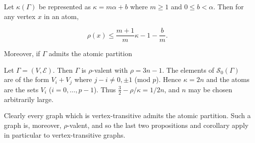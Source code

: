 Let $\kappa(\Gamma)$ be represented as $\kappa = m\alpha + b$ where $m \geq 1$ and $0 \leq b < \alpha$. Then for any vertex $x$ in an atom,

$$\rho(x) \leq \frac{m + 1}{m} \kappa - 1 - \frac{b}{m}.$$

Moreover, if $\Gamma$ admits the atomic partition

Let $\Gamma = (V, \mathcal{E})$. Then $\Gamma$ is $\rho$-valent with $\rho = 3n - 1$. The elements of $\mathcal{S}_0(\Gamma)$ are of the form $V_i + V_j$ where $j - i \neq 0, \pm 1$ (mod $p$). Hence $\kappa = 2n$ and the atoms are the sets $V_i$ ($i = 0, \ldots, p - 1$). Thus $\frac{3}{2} - \rho/\kappa = 1/2n$, and $n$ may be chosen arbitrarily large.

Clearly every graph which is vertex-transitive admits the atomic partition. Such a graph is, moreover, $\rho$-valent, and so the last two propositions and corollary apply in particular to vertex-transitive graphs.
